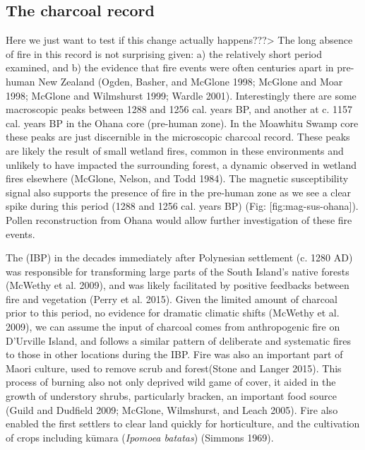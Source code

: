 \documentclass[]{article}
\begin{document}
\subsection{The charcoal record}\label{the-charcoal-record}

Here we just want to test if this change actually happens???\textgreater{} The long absence of fire in this record is not surprising given: a) the relatively short period examined, and b) the evidence that fire events were often centuries apart in pre-human New Zealand (Ogden, Basher, and McGlone 1998; McGlone and Moar 1998; McGlone and Wilmshurst 1999; Wardle 2001). Interestingly there are some macroscopic peaks between 1288 and 1256 cal. years BP, and another at c. 1157 cal. years BP in the Ohana core (pre-human zone). In the Moawhitu Swamp core these peaks are just discernible in the microscopic charcoal record. These peaks are likely the result of small wetland fires, common in these environments and unlikely to have impacted the surrounding forest, a dynamic observed in wetland fires elsewhere (McGlone, Nelson, and Todd 1984). The magnetic susceptibility signal also supports the presence of fire in the pre-human zone as we see a clear spike during this period (1288 and 1256 cal. years BP) (Fig: {[}fig:mag-sus-ohana{]}). Pollen reconstruction from Ohana would allow further investigation of these fire events.

The (IBP) in the decades immediately after Polynesian settlement (c. 1280 AD) was responsible for transforming large parts of the South Island's native forests (McWethy et al. 2009), and was likely facilitated by positive feedbacks between fire and vegetation (Perry et al. 2015). Given the limited amount of charcoal prior to this period, no evidence for dramatic climatic shifts (McWethy et al. 2009), we can assume the input of charcoal comes from anthropogenic fire on D'Urville Island, and follows a similar pattern of deliberate and systematic fires to those in other locations during the IBP. Fire was also an important part of Maori culture, used to remove scrub and forest(Stone and Langer 2015). This process of burning also not only deprived wild game of cover, it aided in the growth of understory shrubs, particularly bracken, an important food source (Guild and Dudfield 2009; McGlone, Wilmshurst, and Leach 2005). Fire also enabled the first settlers to clear land quickly for horticulture, and the cultivation of crops including kūmara (\emph{Ipomoea batatas}) (Simmons 1969).
\end{document}
